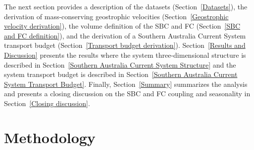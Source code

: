 \documentclass[preprint,3p,review,12pt]{elsarticle}
\begin{document}
The next section provides a description of the datasets (Section~\ref{Datasets}), the derivation of mass-conserving geostrophic velocities (Section~\ref{Geostrophic velocity derivation}), the volume definition of the SBC and FC (Section~\ref{SBC and FC definition}), and the derivation of a Southern Australia Current System transport budget (Section~\ref{Transport budget derivation}). Section~\ref{Results and Discussion} presents the results where the system three-dimensional structure is described in Section~\ref{Southern Australia Current System Structure} and the system transport budget is described in Section~\ref{Southern Australia Current System Transport Budget}. Finally, Section~\ref{Summary} summarizes the analysis and presents a closing discussion on the SBC and FC coupling and seasonality in Section~\ref{Closing discussion}.

\section{Methodology} \label{Methodology}
\end{document}
